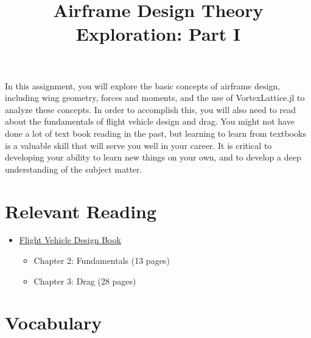 \documentclass[11pt]{article}
\title{Airframe Design Theory Exploration: Part I}
\date{}
\begin{document}
\maketitle
\vspace{-2cm}


In this assignment, you will explore the basic concepts of airframe design, including wing geometry, forces and moments, and the use of VortexLattice.jl to analyze these concepts. In order to accomplish this, you will also need to read about the fundamentals of flight vehicle design and drag. You might not have done a lot of text book reading in the past, but learning to learn from textbooks is a valuable skill that will serve you well in your career. It is critical to developing your ability to learn new things on your own, and to develop a deep understanding of the subject matter. 



\section*{Relevant Reading}
\label{sec:reading}

\begin{itemize}
	\item \href{http://flowlab.groups.et.byu.net/me415/flight.pdf}{Flight Vehicle Design Book}
	\begin{itemize}
		\item Chapter 2: Fundamentals (13 pages)
		\item Chapter 3: Drag (28 pages)
	\end{itemize}

\end{itemize}





\section{Vocabulary}
\label{sec:vocab}
\end{document}
